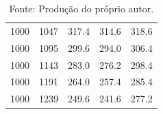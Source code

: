 \begin{table}[ht]
\begin{minipage}{0.45\textwidth}
\begin{tabular}{cc|ccc}
        1000 & 1047  & 317.4 & \cellcolor{blue!20}314.6  & 318.6  \\
        1000 & 1095  & 299.6 & \cellcolor{blue!20}294.0  & 306.4  \\
        1000 & 1143  & 283.0 & \cellcolor{blue!20}276.2  & 298.4  \\
        1000 & 1191  & 264.0 & \cellcolor{blue!20}257.4  & 285.4  \\
        1000 & 1239  & 249.6 & \cellcolor{blue!20}241.6  & 277.2  \\
        \hline
    \end{tabular}
    \caption*{\small Fonte: Produção do próprio autor.}
    \label{tab:construct-regressao-large}
\end{minipage}
\end{table}











    